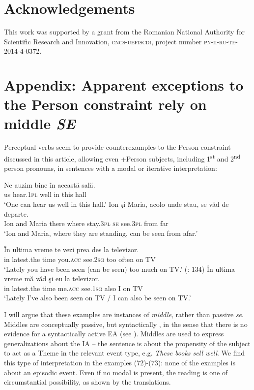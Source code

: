 \documentclass[output=paper]{langsci/langscibook}
\begin{document}
\section*{Acknowledgements}
This work was supported by a grant from the Romanian National Authority for Scientific Research and Innovation, \textsc{cncs-uefiscdi}, project number \textsc{pn-ii-ru-te-2014-4-0372}. 

\section*{Appendix: Apparent exceptions to the Person constraint rely on middle \textit{SE}}

Perceptual verbs seem to provide counterexamples to the Person constraint discussed in this article, allowing even +Person subjects, including 1\textsuperscript{st} and 2\textsuperscript{nd} person pronouns, in sentences with a modal or iterative interpretation:

\ea%
    \label{ex:giurgea:72}
    \ea
    \gll Ne auzim    bine în această sală.    \\
         us  hear.\textsc{1pl} well in this      hall\\
    \glt ‘One can hear us well in this hall.’
    \ex
    \gll  Ion şi   Maria,  acolo  unde  stau,      se văd       de     departe.\\
          Ion and Maria  there where stay.\textsc{3pl} \textsc{se} see.\textsc{3pl} from far\\
    \glt ‘Ion and Maria, where they are standing, can be seen from afar.’
    \z
\z

\ea%
    \label{ex:giurgea:73}
    \ea
    \gll În ultima     vreme te            vezi       prea des     la   televizor. \\
         in latest.the time   you.\textsc{acc}  see.\textsc{2sg} too    often on TV\\
    \glt ‘Lately you have been seen (can be seen) too much on TV.’ (\citealt{Dobrovie-Sorin2017}: 134)
    \ex
    \gll În ultima     vreme  mă        văd       şi     eu  la   televizor.\\
         in latest.the time     me.\textsc{acc} see.\textsc{1sg} also I    on TV\\
    \glt ‘Lately I’ve also been seen on TV / I can also be seen on TV.’
    \z
\z

I will argue that these examples are instances of \textit{middle}, rather than passive \textit{se}. Middles are conceptually passive, but syntactically , in the sense that there is no evidence for a syntactically active EA (see \citealt{Schäfer2008}). Middles are used to express generalizations about the IA -- the sentence is about the propensity of the subject to act as a Theme in the relevant event type, e.g.  \textit{These books sell well}. We find this type of interpretation in the examples (72)-(73): none of the examples is about an episodic event. Even if no modal is present, the reading is one of circumstantial possibility, as shown by the translations. 
\end{document}

